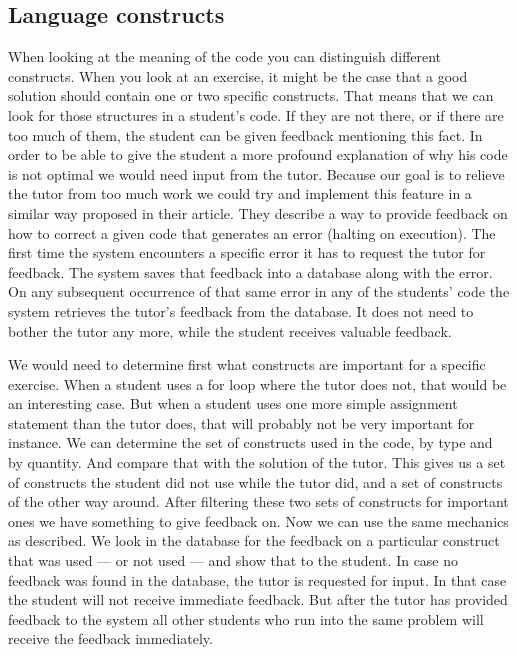 \subsection{Language constructs}

When looking at the meaning of the \gls{code}
you can distinguish different \glspl{construct}.
When you look at an \gls{exercise},
it might be the case that a good \gls{solution}
should contain one or two specific \glspl{construct}.
That means that we can look for those structures
in a \gls{student}'s \gls{code}.
If they are not there, or if there are too much of them,
the \gls{student} can be given \gls{feedback} mentioning this fact.
In order to be able to give the \gls{student} a more profound explanation
of why his \gls{code} is not optimal we would need input from the \gls{tutor}.
Because our goal is to relieve the \gls{tutor} from too much work
we could try and implement this feature in a similar way
\citet[Section 3.2]{watson2011learning} proposed in their article.
They describe a way to provide \gls{feedback}
on how to correct a given \gls{code} that generates an error
(halting on execution).
The first time the system encounters a specific error
it has to request the \gls{tutor} for \gls{feedback}.
The system saves that \gls{feedback} into a database along with the error.
On any subsequent occurrence of that same error
in any of the \glspl{student}' \gls{code}
the system retrieves the \gls{tutor}'s \gls{feedback} from the database.
It does not need to bother the \gls{tutor} any more,
while the \gls{student} receives valuable \gls{feedback}.

We would need to determine first what \glspl{construct} are important
for a specific \gls{exercise}.
When a \gls{student} uses a for loop where the \gls{tutor} does not,
that would be an interesting case.
But when a \gls{student} uses one more simple assignment statement
than the \gls{tutor} does,
that will probably not be very important for instance.
We can determine the set of \glspl{construct} used in the \gls{code},
by type and by quantity.
And compare that with the \gls{solution} of the \gls{tutor}.
This gives us a set of \glspl{construct} the \gls{student} did not use
while the \gls{tutor} did,
and a set of \glspl{construct} of the other way around.
After filtering these two sets of \glspl{construct} for important ones
we have something to give \gls{feedback} on.
Now we can use the same mechanics as \citet{watson2011learning} described.
We look in the database for the \gls{feedback}
on a particular \gls{construct} that was used --- or not used ---
and show that to the \gls{student}.
In case no \gls{feedback} was found in the database,
the \gls{tutor} is requested for input.
In that case the \gls{student} will not receive immediate \gls{feedback}.
But after the \gls{tutor} has provided \gls{feedback} to the system
all other \glspl{student} who run into the same problem
will receive the \gls{feedback} immediately.

